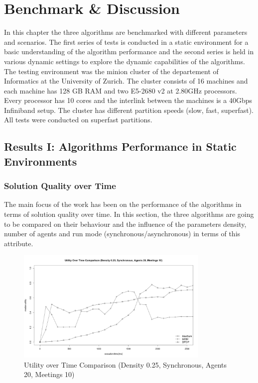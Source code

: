 \chapter{Benchmark \& Discussion}

In this chapter the three algorithms are benchmarked with different parameters and scenarios. The first series of tests is conducted in a static environment for a basic understanding of the algorithm performance and the second series is held in various dynamic settings to explore the dynamic capabilities of the algorithms. The testing environment was the minion cluster of the departement of Informatics at the University of Zurich. The cluster consists of 16 machines and each machine has 128 GB RAM and two E5-2680 v2 at 2.80GHz processors. Every processor has 10 cores and the interlink between the machines is a 40Gbps Infiniband setup. The cluster has different partition speeds (slow, fast, superfast). All tests were conducted on superfast partitions.

\section{Results I: Algorithms Performance in Static Environments}

\subsection{Solution Quality over Time}

The main focus of the work has been on the performance of the algorithms in terms of solution quality over time.  In this section, the three algorithms are going to be compared on their behaviour and the influence of the parameters density, number of agents and run mode (synchronous/asynchronous) in terms of this attribute.

\begin{figure}[H]
\centering
\includegraphics[width=350px]{graphics/experiments/static/st_1}
\caption{Utility over Time Comparison (Density 0.25, Synchronous, Agents 20, Meetings 10)}
\label{fig:st1}
\end{figure}

